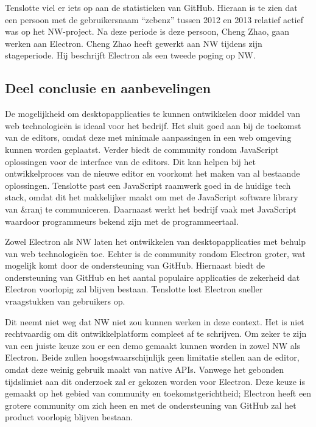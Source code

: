 Tenslotte viel er iets op aan de statistieken van GitHub. Hieraan is te zien dat een persoon met de gebruikersnaam “zcbenz” tussen 2012 en 2013 relatief actief was op het NW-project. Na deze periode is deze persoon, Cheng Zhao, gaan werken aan Electron. Cheng Zhao heeft gewerkt aan NW tijdens zijn stageperiode. Hij beschrijft Electron als een tweede poging op NW\cite{FromNWToElectronZhaoCheng}. 

\subsection{Deel conclusie en aanbevelingen}
De mogelijkheid om desktopapplicaties te kunnen ontwikkelen door middel van web technologieën is ideaal voor het bedrijf. Het sluit goed aan bij de toekomst van de editors, omdat deze met minimale aanpassingen in een web omgeving kunnen worden geplaatst. Verder biedt de community rondom JavaScript oplossingen voor de interface van de editors. Dit kan helpen bij het ontwikkelproces van de nieuwe editor en voorkomt het maken van al bestaande oplossingen. Tenslotte past een JavaScript raamwerk goed in de huidige tech stack, omdat dit het makkelijker maakt om met de JavaScript software library van \&ranj te communiceren. Daarnaast werkt het bedrijf vaak met JavaScript waardoor programmeurs bekend zijn met de programmeertaal.

Zowel Electron als NW laten het ontwikkelen van desktopapplicaties met behulp van web technologieën toe. Echter is de community rondom Electron groter, wat mogelijk komt door de ondersteuning van GitHub. Hiernaast biedt de ondersteuning van GitHub en het aantal populaire applicaties de zekerheid dat Electron voorlopig zal blijven bestaan. Tenslotte lost Electron sneller vraagstukken van gebruikers op.

Dit neemt niet weg dat NW niet zou kunnen werken in deze context. Het is niet rechtvaardig om dit ontwikkelplatform compleet af te schrijven. Om zeker te zijn van een juiste keuze zou er een demo gemaakt kunnen worden in zowel NW als Electron. Beide zullen hoogstwaarschijnlijk geen limitatie stellen aan de editor, omdat deze weinig gebruik maakt van native APIs. Vanwege het gebonden tijdslimiet aan dit onderzoek zal er gekozen worden voor Electron. Deze keuze is gemaakt op het gebied van community en toekomstgerichtheid; Electron heeft een grotere community om zich heen en met de ondersteuning van GitHub zal het product voorlopig blijven bestaan.

